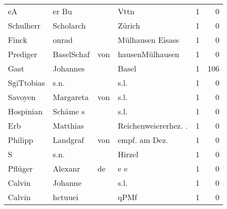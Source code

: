 \begin{tabular}{llllrr}
                       eA &                              er Bu &             &                                        Vttn &          1 &         0 \\
                Schulherr &                          Scholarch &             &                                      Zürich &          1 &         0 \\
                    Finck &                              onrad &             &                            Mülhausen Eisass &          1 &         0 \\
                 Prediger &                         BaselSchaf &         von &                             hausenMülhausen &          1 &         0 \\
                     Gast &                           Johannes &             &                                       Basel &          1 &       106 \\
               SgiTtobias &                               s.n. &             &                                        s.l. &          1 &         0 \\
                  Savoyen &                          Margareta &         von &                                        s.l. &          1 &         0 \\
                Hospinian &                           Schäme s &             &                                        s.l. &          1 &         0 \\
                      Erb &                           Matthias &             &                       Reichenweiererhez. .  &          1 &         0 \\
                  Philipp &                           Landgraf &         von &                              empf. am Dez.  &          1 &         0 \\
                        S &                               s.n. &             &                                      Hirzel &          1 &         0 \\
                  Pflüger &                            Alexanr &          de &                                         e e &          1 &         0 \\
                   Calvin &                            Johanne &             &                                        s.l. &          1 &         0 \\
                   Calvin &                            hctuuei &             &                                        qPMf &          1 &         0 \\

\end{tabular}
